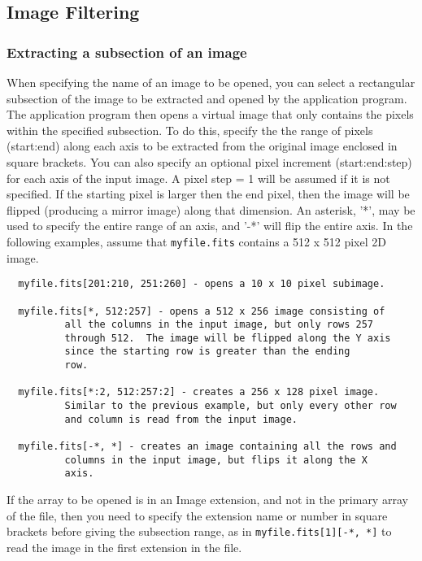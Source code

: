 \documentclass[11pt]{article}
\begin{document}
\subsection{Image Filtering}

\subsubsection{Extracting a subsection of an image}

When specifying the name of an image to be opened, you can select a
rectangular subsection of the image to be extracted and opened by the
application program.  The application program then opens a virtual
image that only contains the pixels within the specified subsection.
To do this, specify the the range of pixels (start:end) along each axis
to be extracted from the original image enclosed in square brackets.
You can also specify an optional pixel increment (start:end:step) for
each axis of the input image.  A pixel step = 1 will be assumed if it
is not specified.  If the starting pixel is larger then the end pixel,
then the image will be flipped (producing a mirror image) along that
dimension.  An asterisk, '*', may be used to specify the entire range
of an axis, and '-*' will flip the entire axis.  In the following
examples, assume that {\tt myfile.fits} contains a 512 x 512 pixel 2D
image.

\begin{verbatim}
  myfile.fits[201:210, 251:260] - opens a 10 x 10 pixel subimage.

  myfile.fits[*, 512:257] - opens a 512 x 256 image consisting of
	      all the columns in the input image, but only rows 257
	      through 512.  The image will be flipped along the Y axis
	      since the starting row is greater than the ending
	      row.

  myfile.fits[*:2, 512:257:2] - creates a 256 x 128 pixel image.
	      Similar to the previous example, but only every other row
	      and column is read from the input image.

  myfile.fits[-*, *] - creates an image containing all the rows and
	      columns in the input image, but flips it along the X
	      axis.
\end{verbatim}

If the array to be opened is in an Image extension, and not in the
primary array of the file, then you need to specify the extension
name or number in square brackets before giving the subsection range,
as in {\tt  myfile.fits[1][-*, *]} to read the image in the
first extension in the file.
\end{document}
